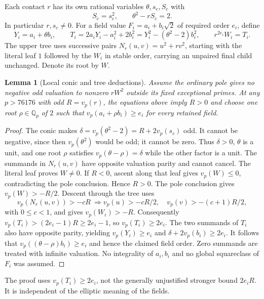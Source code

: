 \documentclass[11pt]{article}
\newtheorem{lemma}[theorem]{Lemma}
\theoremstyle{definition}
\theoremstyle{remark}
\newcommand{\Q}{\mathbb Q}
\begin{document}
Each contact $r$ has its own rational variables $\theta,s_c,S_c$ with
\[
 S_c=s_c^2,\qquad \theta^2-rS_c=2.
\]
In particular $r,s_c\ne0$. For a field value $F_i=a_i+b_i\sqrt2$ of
required order $e_i$, define
\[
 Y_i=a_i+\theta b_i,\qquad
 T_i=2a_iY_i-a_i^2+2b_i^2
     =Y_i^2-(\theta^2-2)b_i^2,\qquad
 r^{2e_i}W_i=T_i.
\]
The upper tree uses successive pairs $N_r(u,v)=u^2+rv^2$, starting with
the literal leaf $1$ followed by the $W_i$ in stable order, carrying an
unpaired final child unchanged. Denote its root by $W$.

\begin{lemma}[Local conic and tree deductions]
\label{lem:quartic-private-conic-packing}
Assume the ordinary pole gives no negative odd valuation to nonzero
$rW^2$ outside its fixed exceptional primes. At any $p>76176$ with odd
$R=v_p(r)$, the equations above imply $R>0$ and choose one root
$\rho\in\Q_p$ of $2$ such that
$v_p(a_i+\rho b_i)\ge e_i$ for every retained field.
\end{lemma}
\begin{proof}
The conic makes $\delta=v_p(\theta^2-2)=R+2v_p(s_c)$ odd.
It cannot be negative, since then $v_p(\theta^2)$ would be odd; it cannot
be zero. Thus $\delta>0$, $\theta$ is a unit, and one root $\rho$ satisfies
$v_p(\theta-\rho)=\delta$ while the other factor is a unit.
The summands in $N_r(u,v)$ have opposite valuation parity and cannot
cancel. The literal leaf proves $W\ne0$. If $R<0$, ascent along that
leaf gives $v_p(W)\le0$, contradicting the pole conclusion. Hence $R>0$.
The pole conclusion gives $v_p(W)>-R/2$. Descent through the tree uses
\[
 v_p(N_r(u,v))>-cR\ \Longrightarrow
 v_p(u)>-cR/2,\quad v_p(v)>-(c+1)R/2,
\]
with $0\le c<1$, and gives $v_p(W_i)>-R$. Consequently
$v_p(T_i)>(2e_i-1)R\ge2e_i-1$, so $v_p(T_i)\ge2e_i$.
The two summands of $T_i$ also have opposite parity, yielding
$v_p(Y_i)\ge e_i$ and $\delta+2v_p(b_i)\ge2e_i$.
It follows that $v_p((\theta-\rho)b_i)\ge e_i$ and hence the claimed
field order. Zero summands are treated with infinite valuation. No
integrality of $a_i,b_i$ and no global squareclass of $F_i$ was assumed.
\end{proof}

The proof uses $v_p(T_i)\ge2e_i$, not the generally unjustified stronger
bound $2e_iR$. It is independent of the elliptic meaning of the fields.
\end{document}
